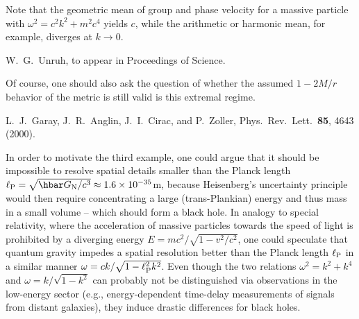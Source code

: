 \documentclass[12pt,aps,prl,showpacs,amssymb,nofootinbib,onecolumn]{revtex4-2}
\begin{document}
\begin{thebibliography}{499}
Note that the geometric mean of group and phase velocity for a massive
particle with $\omega^2=c^2k^2+m^2c^4$ yields $c$, while the
arithmetic or harmonic mean, for example, diverges at $k\to0$. 

W.~G.~Unruh, to appear in Proceedings of Science.  

Of course, one should also ask the question of whether the assumed
$1-2M/r$ behavior of the metric is still valid is this extremal
regime. 

L.~J.~Garay, J.~R.~Anglin, J.~I.~Cirac, and P.~Zoller,
Phys.\ Rev.\ Lett.\ {\bf 85}, 4643 (2000). 

In order to motivate the third example, one could argue that it should 
be impossible to resolve spatial details smaller than the Planck
length 
$\ell_{\rm P}=\sqrt{\hbar G_{\rm N}/c^3}\approx1.6\times10^{-35}$m,
because Heisenberg's uncertainty principle would then require
concentrating a large (trans-Plankian) energy and thus mass in a small 
volume -- which should form a black hole. 
%
In analogy to special relativity, where the acceleration of massive
particles towards the speed of light is prohibited by a diverging
energy $E=mc^2/\sqrt{1-v^2/c^2}$, one could speculate that quantum
gravity impedes a spatial resolution better than the Planck length
$\ell_{\rm P}$ in a similar manner 
$\omega=ck/\sqrt{1-\ell_{\rm P}^2k^2}$.
%
%
Even though the two relations $\omega^2=k^2+k^4$ and 
$\omega=k/\sqrt{1-k^2}$ can probably not be
distinguished via observations in the low-energy sector 
(e.g., energy-dependent time-delay measurements of signals from
distant galaxies), they induce drastic differences for black holes.  

\end{thebibliography}
\end{document}
